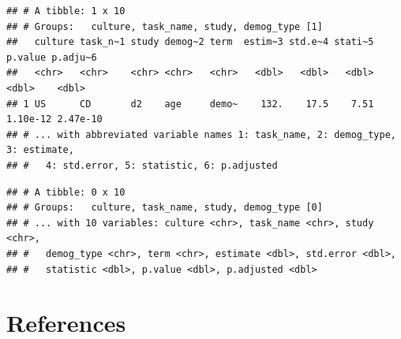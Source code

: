 \documentclass[
  man]{apa6}
\begin{document}
\begin{verbatim}
## # A tibble: 1 x 10
## # Groups:   culture, task_name, study, demog_type [1]
##   culture task_n~1 study demog~2 term  estim~3 std.e~4 stati~5  p.value p.adju~6
##   <chr>   <chr>    <chr> <chr>   <chr>   <dbl>   <dbl>   <dbl>    <dbl>    <dbl>
## 1 US      CD       d2    age     demo~    132.    17.5    7.51 1.10e-12 2.47e-10
## # ... with abbreviated variable names 1: task_name, 2: demog_type, 3: estimate,
## #   4: std.error, 5: statistic, 6: p.adjusted
\end{verbatim}

\begin{verbatim}
## # A tibble: 0 x 10
## # Groups:   culture, task_name, study, demog_type [0]
## # ... with 10 variables: culture <chr>, task_name <chr>, study <chr>,
## #   demog_type <chr>, term <chr>, estimate <dbl>, std.error <dbl>,
## #   statistic <dbl>, p.value <dbl>, p.adjusted <dbl>
\end{verbatim}

\setlength{\parindent}{-0.5in}
\setlength{\leftskip}{0.5in}

\newpage

\hypertarget{references}{%
\section{References}\label{references}}
\end{document}
